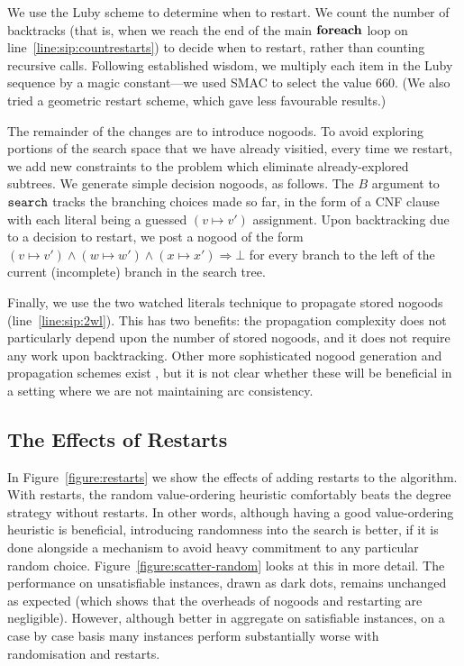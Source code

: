 \documentclass[a4paper,UKenglish]{lipics-v2018}
\newcommand{\siplineref}[1]{line~\ref{line:sip:#1}}
\newcommand{\figureref}[1]{Figure~\ref{#1}}
\newcommand{\Figureref}[1]{Figure~\ref{#1}}
\begin{document}
We use the Luby scheme \cite{DBLP:journals/ipl/LubySZ93} to determine when to restart. We count the
number of backtracks (that is, when we reach the end of the main $\KwSty{foreach}$ loop on
\siplineref{countrestarts}) to decide when to restart, rather than counting recursive calls.
Following established wisdom, we multiply each item in the Luby sequence by a magic constant---we
used SMAC \cite{DBLP:conf/lion/HutterHL11} to select the value 660. (We also tried a geometric
restart scheme, which gave less favourable results.)

The remainder of the changes are to introduce nogoods. To avoid exploring portions of the search
space that we have already visitied, every time we restart, we add new constraints to the problem
which eliminate already-explored subtrees. We generate simple decision nogoods, as follows. The $B$
argument to $\FuncSty{search}$ tracks the branching choices made so far, in the form of a CNF clause
with each literal being a guessed $(v \mapsto v')$ assignment. Upon backtracking due to a decision to
restart, we post a nogood of the form $(v \mapsto v') \wedge (w \mapsto w') \wedge (x \mapsto x')
\Rightarrow \bot$ for every branch to the left of the current (incomplete) branch in the search tree.

Finally, we use the two watched literals technique \cite{DBLP:conf/dac/MoskewiczMZZM01} to
propagate stored nogoods (\siplineref{2wl}). This has two benefits: the propagation complexity does
not particularly depend upon the number of stored nogoods, and it does not require any work upon
backtracking.  Other more sophisticated nogood generation and propagation schemes exist
\cite{DBLP:conf/aaai/LeeSZ16,DBLP:conf/cp/GlorianBLLM17}, but it is not clear whether these will be
beneficial in a setting where we are not maintaining arc consistency.

\subsection{The Effects of Restarts}

In \figureref{figure:restarts} we show the effects of adding restarts to the algorithm. With restarts,
the random value-ordering heuristic comfortably beats the degree strategy without restarts. In other
words, although having a good value-ordering heuristic is beneficial, introducing randomness into
the search is better, if it is done alongside a mechanism to avoid heavy commitment to any
particular random choice. \Figureref{figure:scatter-random} looks at this in more detail. The performance
on unsatisfiable instances, drawn as dark dots, remains unchanged as expected (which shows that the
overheads of nogoods and restarting are negligible). However, although better in aggregate on
satisfiable instances, on a case by case basis many instances perform substantially worse with
randomisation and restarts.
\end{document}
